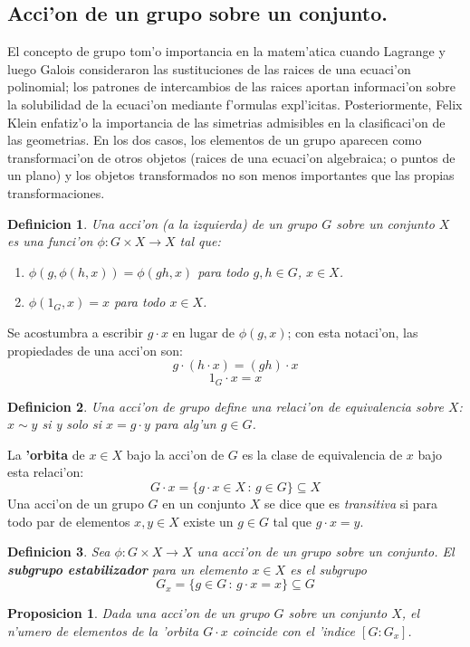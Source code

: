 \documentclass[a4paper,openright,12pt]{book}
\numberwithin{equation}{section} %
\newtheorem{proposicion}{Proposicion}[section] %
\newtheorem{definicion}{Definicion}[section] %
\begin{document}
\subsection{Acci'on de un grupo sobre un conjunto.}
El concepto de grupo tom'o importancia en la matem'atica cuando Lagrange y luego Galois consideraron las sustituciones de las raices de una ecuaci'on polinomial; los patrones de intercambios de las raices aportan informaci'on sobre la solubilidad de la ecuaci'on mediante f'ormulas expl'icitas. Posteriormente, Felix Klein enfatiz'o la importancia de las simetrias admisibles en la clasificaci'on de las geometrias. En los dos casos, los elementos de un grupo aparecen como transformaci'on de otros objetos (raices de una ecuaci'on algebraica; o puntos de un plano) y los objetos transformados no son menos importantes que las propias transformaciones.
\begin{definicion}
Una acci'on (a la izquierda) de un grupo $G$ sobre un conjunto $X$ es una funci'on $\phi : G \times X \rightarrow X$ tal que: 
\begin{enumerate}
\item $\phi(g, \phi(h, x))=\phi(gh, x)$ para todo $g, h \in G$, $x \in X$.
\item $\phi(1_{G},x)=x$ para todo $x \in X$.
\end{enumerate}
\end{definicion}
Se acostumbra a escribir $g \cdot x$ en lugar de $\phi(g,x)$; con esta notaci'on, las propiedades de una acci'on son:
\[
g \cdot (h \cdot x)=(gh)\cdot x
\]
\[
1_{G}\cdot x = x
\]
\begin{definicion}
Una acci'on de grupo define una relaci'on de equivalencia sobre $X$: $x\sim y$ si y solo si $x=g \cdot y$ para alg'un $g \in G$.
\end{definicion}
La \textbf{'orbita} de $x \in X$ bajo la acci'on de $G$ es la clase de equivalencia de $x$ bajo esta relaci'on:
\[
G \cdot x = \{g\cdot x \in X\, :\,g\in G \}\subseteq X
\]
Una acci'on de un grupo $G$ en un conjunto $X$ se dice que es \textit{transitiva} si para todo par de elementos $x,y \in X$ existe un $g \in G$ tal que $g \cdot x = y$. 
\begin{definicion}
Sea $\phi : G \times X \rightarrow X$ una acci'on de un grupo sobre un conjunto. El \textbf{subgrupo estabilizador} para un elemento $x \in X$ es el subgrupo
\[
G_{x}=\{g \in G\,:\,g \cdot x = x  \} \subseteq G
\]
\end{definicion}
\begin{proposicion}
Dada una acci'on de un grupo $G$ sobre un conjunto $X$, el n'umero de elementos de la 'orbita $G \cdot x$ coincide con el 'indice $[G:G_{x}]$.
\end{proposicion}
\end{document}
